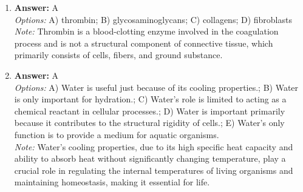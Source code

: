 \documentclass[12pt]{article}
\begin{document}
\begin{enumerate}[label=\arabic*.]
\item \textbf{Answer:} A
\\ \textit{Options:} A) thrombin; B) glycosaminoglycans; C) collagens; D) fibroblasts
\\ \textit{Note:} Thrombin is a blood-clotting enzyme involved in the coagulation process and is not a structural component of connective tissue, which primarily consists of cells, fibers, and ground substance.
\item \textbf{Answer:} A
\\ \textit{Options:} A) Water is useful just because of its cooling properties.; B) Water is only important for hydration.; C) Water's role is limited to acting as a chemical reactant in cellular processes.; D) Water is important primarily because it contributes to the structural rigidity of cells.; E) Water's only function is to provide a medium for aquatic organisms.
\\ \textit{Note:} Water's cooling properties, due to its high specific heat capacity and ability to absorb heat without significantly changing temperature, play a crucial role in regulating the internal temperatures of living organisms and maintaining homeostasis, making it essential for life.
\end{enumerate}
\end{document}
